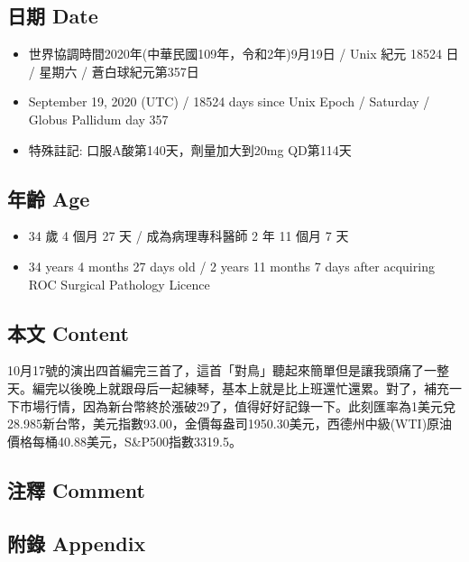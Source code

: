 \documentclass[
]{article}
\providecommand{\tightlist}{%
  \setlength{\itemsep}{0pt}\setlength{\parskip}{0pt}}
\begin{document}
\hypertarget{ux65e5ux671f-date-18}{%
\subsection{日期 Date}\label{ux65e5ux671f-date-18}}

\begin{itemize}
\tightlist
\item
  世界協調時間2020年(中華民國109年，令和2年)9月19日 / Unix 紀元 18524 日
  / 星期六 / 蒼白球紀元第357日
\item
  September 19, 2020 (UTC) / 18524 days since Unix Epoch / Saturday /
  Globus Pallidum day 357
\item
  特殊註記: 口服A酸第140天，劑量加大到20mg QD第114天
\end{itemize}

\hypertarget{ux5e74ux9f61-age-18}{%
\subsection{年齡 Age}\label{ux5e74ux9f61-age-18}}

\begin{itemize}
\tightlist
\item
  34 歲 4 個月 27 天 / 成為病理專科醫師 2 年 11 個月 7 天
\item
  34 years 4 months 27 days old / 2 years 11 months 7 days after
  acquiring ROC Surgical Pathology Licence
\end{itemize}

\hypertarget{ux672cux6587-content-18}{%
\subsection{本文 Content}\label{ux672cux6587-content-18}}

10月17號的演出四首編完三首了，這首「對鳥」聽起來簡單但是讓我頭痛了一整天。編完以後晚上就跟母后一起練琴，基本上就是比上班還忙還累。對了，補充一下市場行情，因為新台幣終於漲破29了，值得好好記錄一下。此刻匯率為1美元兌28.985新台幣，美元指數93.00，金價每盎司1950.30美元，西德州中級(WTI)原油價格每桶40.88美元，S\&P500指數3319.5。

\hypertarget{ux6ce8ux91cb-comment-18}{%
\subsection{注釋 Comment}\label{ux6ce8ux91cb-comment-18}}

\hypertarget{ux9644ux9304-appendix-18}{%
\subsection{附錄 Appendix}\label{ux9644ux9304-appendix-18}}
\end{document}
